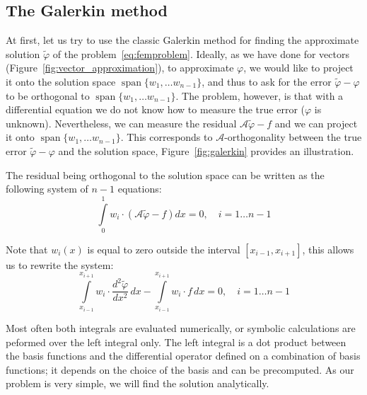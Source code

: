 \documentclass[notitlepage,oneside]{book}
\DeclareMathOperator{\Span}{span}
\begin{document}
\subsection{The Galerkin method}
At first, let us try to use the classic Galerkin method for finding the approximate solution $\tilde \varphi$ of the problem~\eqref{eq:femproblem}.
Ideally, as we have done for vectors (Figure~\ref{fig:vector_approximation}), to approximate $\varphi$, we would like to project it onto the solution space $\Span\{w_1,\dots w_{n-1}\}$,
and thus to ask for the error $\tilde\varphi - \varphi$ to be orthogonal to $\Span\{w_1,\dots w_{n-1}\}$.
The problem, however, is that with a differential equation we do not know how to measure the true error ($\varphi$ is unknown).
Nevertheless, we can measure the residual $\mathcal A\tilde{\varphi} - f$ and we can project it onto $\Span\{w_1,\dots w_{n-1}\}$.
This corresponds to $\mathcal A$-orthogonality between the true error $\tilde\varphi - \varphi$ and the solution space, Figure~\ref{fig:galerkin} provides an illustration.

The residual being orthogonal to the solution space can be written as the following system of $n-1$ equations:
\begin{equation}
\label{eq:galerkin}
\int\limits_0^1 w_i \cdot \left(\mathcal A\tilde{\varphi} - f\right) dx = 0, \quad i = 1\dots n-1 
\end{equation}

Note that $w_i(x)$ is equal to zero outside the interval $[x_{i-1}, x_{i+1}]$, this allows us to rewrite the system:
$$
\int\limits_{x_{i-1}}^{x_{i+1}} w_i \cdot \frac{d^2\tilde{\varphi}}{dx^2}\,dx - \int\limits_{x_{i-1}}^{x_{i+1}} w_i\cdot f\,dx = 0, \quad i = 1\dots n-1
$$

Most often both integrals are evaluated numerically, or symbolic calculations are peformed over the left integral only.
The left integral is a dot product between the basis functions and the differential operator defined on a combination of basis functions;
it depends on the choice of the basis and can be precomputed.
As our problem is very simple, we will find the solution analytically.
\end{document}
